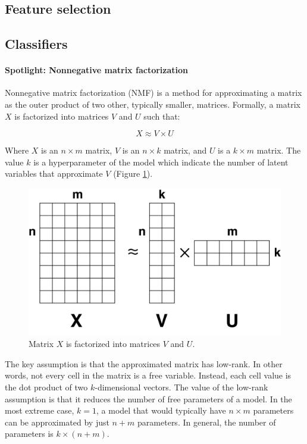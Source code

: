 \documentclass{article} %
\begin{document}
\subsection{Feature selection}



\subsection{Classifiers}\label{classifiers}

\paragraph{Spotlight: Nonnegative matrix factorization}

Nonnegative matrix factorization (NMF) is a method for approximating a matrix as the outer product of two other, typically smaller, matrices. Formally, a matrix $X$ is factorized into matrices $V$ and $U$ such that:

\begin{equation} \label{eq:1}
X \approx V \times U
\end{equation}

Where $X$ is an $n \times m$ matrix, $V$ is an $n \times k$ matrix, and $U$ is a $k \times m$ matrix. The value $k$ is a hyperparameter of the model which indicate the number of latent variables that approximate $V$ (Figure \ref{fig:matrix_completion}).

\begin{figure}[!htbp]
    \centering
    \includegraphics[scale=0.2]{figures/matrix_completion}
    \caption{\small Matrix $X$ is factorized into matrices $V$ and $U$.}
    \label{fig:matrix_completion}
\end{figure}

The key assumption is that the approximated matrix has low-rank. In other words, not every cell in the matrix is a free variable. Instead, each cell value is the dot product of two $k$-dimensional vectors. The value of the low-rank assumption is that it reduces the number of free parameters of a model. In the most extreme case, $k=1$, a model that would typically have $n \times m$ parameters can be approximated by just $n + m$ parameters. In general, the number of parameters is $k \times (n + m)$.
\end{document}

